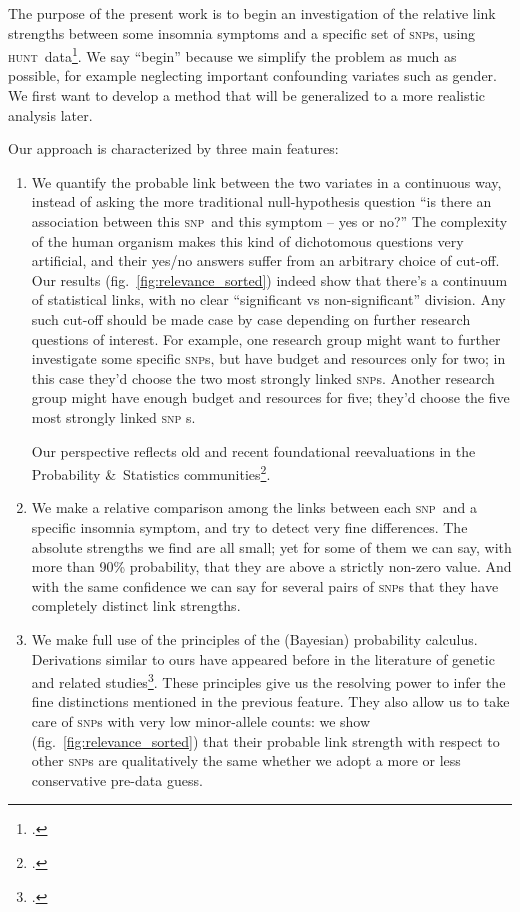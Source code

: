 \documentclass[\ifafour a4paper,12pt,\else a5paper,10pt,\fi%
onecolumn,oneside,article,%
british%
]{memoir}
\theoremstyle{remark}
\theoremstyle{innote}
\newcommand*{\citep}{\footcites}
\newcommand*{\amp}{\&}
\renewcommand*{\|}[1][]{\nonscript\,#1\vert\nonscript\;\mathopen{}}
\newcommand*{\fig}{fig.}%
\newcommand*{\snp}{\textsc{snp}}
\newcommand*{\hunt}{\textsc{hunt}}
\begin{document}
The purpose of the present work is to begin an investigation of the
relative link strengths between some insomnia symptoms and a specific set
of \snp s, using \hunt\ data\citep{krokstadetal2013}. We say \enquote{begin}
because we simplify the problem as much as possible, for example neglecting
important confounding variates such as gender. We first want to develop a
method that will be generalized to a more realistic analysis later.

Our approach is characterized by three main features:
\begin{enumerate}[wide]
\item We quantify the probable link between the two variates in a
  continuous way, instead of asking the more traditional null-hypothesis
  question \enquote{is there an association between this \snp\ and this
    symptom -- yes or no?} The complexity of the human organism makes this
  kind of dichotomous questions very artificial, and their yes/no answers
  suffer from an arbitrary choice of cut-off. Our results
  (\fig~\ref{fig:relevance_sorted}) indeed show that there's a continuum of
  statistical links, with no clear \enquote{significant vs non-significant}
  division. Any such cut-off should be made case by case depending on
  further research questions of interest. For example, one research group
  might want to further investigate some specific \snp s, but have budget
  and resources only for two; in this case they'd choose the two most
  strongly linked \snp s. Another research group might have enough budget
  and resources for five; they'd choose the five most strongly linked \snp
  s.

  Our perspective reflects old and recent foundational reevaluations in the
  Probability \amp\ Statistics
  communities\citep{asa2016,asa2019,amrheinetal2019}[see
  also Kadane in][pp.~347--348]{coxetal1987}{bergeretal1988,johnson1999}[Box~3
  p.~687]{stephensetal2003}.

\item We make a relative comparison among the links between each \snp\ and
  a specific insomnia symptom, and try to detect very fine differences. The
  absolute strengths we find are all small; yet for some of them we can
  say, with more than 90\% probability, that they are above a strictly
  non-zero value. And with the same confidence we can say for several pairs
  of \snp s that they have completely distinct link strengths.

\item We make full use of the principles of the (Bayesian) probability
  calculus. Derivations similar to ours have appeared before in the
  literature of genetic and related
  studies\citep{lange1995,lange1997_r2003,lewingeretal2007,stingoetal2015}[see
  also refs in][]{stephensetal2009}. These principles give us the resolving
  power to infer the fine distinctions mentioned in the previous feature.
  They also allow us to take care of \snp s with very low minor-allele
  counts: we show (\fig~\ref{fig:relevance_sorted}) that their probable
  link strength with respect to other \snp s are qualitatively the same
  whether we adopt a more or less conservative pre-data guess.


\end{enumerate}
\end{document}

